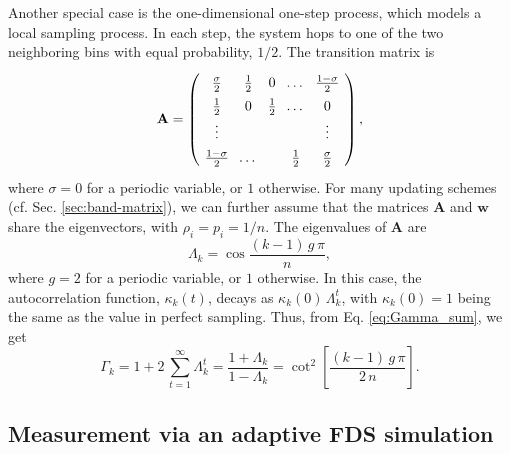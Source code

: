 \documentclass[reprint, superscriptaddress, floatfix]{revtex4-1}
\begin{document}
Another special case is the
one-dimensional one-step process\cite{vankampen},
which models a local sampling process.
In each step, the system hops to
one of the two neighboring bins
with equal probability, $1/2$.
%
The transition matrix is
%
\begin{equation}
  \arraycolsep=3.6pt\def\arraystretch{1.4}
  \mathbf A
  =
  \left(
    \begin{array}{cccccccc}
      \frac \sigma 2 & \frac 1 2 & 0 & \dots & \frac {1 - \sigma} 2 \\
      \frac 1 2 & 0         & \frac 1 2 & \dots & 0 \\
      \vdots & &  & & \vdots \\
      \frac {1 - \sigma} 2 & \dots &  & \frac 1 2 & \frac \sigma 2
    \end{array}
  \right),
\notag
\end{equation}
%
where $\sigma = 0$ for a periodic variable, or $1$ otherwise.
%
For many updating schemes
(cf. Sec. \ref{sec:band-matrix}),
we can further assume that
the matrices $\mathbf A$ and $\mathbf w$
share the eigenvectors,
with $\rho_i = p_i = 1/n$.
%
The eigenvalues of $\mathbf A$ are
$$
  \Lambda_k
  =
  \cos \frac{ (k - 1) \, g \, \pi }
            {            n        }
  ,
$$
where
$g = 2$ for a periodic variable, or $1$ otherwise.
%
In this case,
the autocorrelation function, $\kappa_k(t)$,
decays as $\kappa_k(0) \, \Lambda_k^t$,
with $\kappa_k(0) = 1$ being the same as
the value in perfect sampling.
%
Thus,
from Eq. \eqref{eq:Gamma_sum}, we get
%
\begin{equation}
  \Gamma_k
  =
  1 + 2 \, \sum_{t = 1}^\infty \Lambda_k^t
  =
  \frac{ 1 + \Lambda_k }
       { 1 - \Lambda_k }
  =
  \cot^2 \left[
    \frac{ (k - 1) \, g \, \pi }
         { 2 \, n }
  \right]
  .
\label{eq:Gamma_onestep}
\end{equation}


\subsection{\label{sec:Gamma_measure}
Measurement via an adaptive FDS simulation
}
\end{document}
